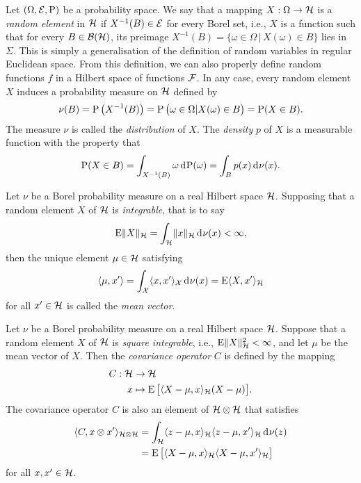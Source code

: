 Let $(\Omega,{\mathcal E},\operatorname{P})$ be a probability space.
We say that a mapping $X:\Omega\to{\mathcal H}$ is a \emph{random element} in ${\mathcal H}$ if $X^{-1}(B)\in{\mathcal E}$ for every Borel set, i.e., $X$ is a function such that for every $B\in{\mathcal B}({\mathcal H})$, its preimage $X^{-1}(B) = \{\omega \in \Omega \,|\, X(\omega) \in B \}$ lies in $\Sigma$.
This is simply a generalisation of the definition of random variables in regular Euclidean space.
From this definition, we can also properly define random functions $f$ in a Hilbert space of functions ${\mathcal F}$.
In any case, every random element $X$ induces a probability measure on ${\mathcal H}$ defined by
\[
  \nu(B) = \operatorname{P}\big(X^{-1}(B)\big) = \operatorname{P}\big( \omega \in \Omega | X(\omega) \in B  \big) = \operatorname{P}(X \in B).
\]
The measure $\nu$ is called the \emph{distribution} of $X$.
The \emph{density} $p$ of $X$ is a measurable function with the property that
\[
  \operatorname{P}(X \in B) = \int_{X^{-1}(B)} \omega \operatorname{d}\hspace{0.5pt}\!\operatorname{P}(\omega) = \int_B p(x) \operatorname{d}\hspace{0.5pt}\!\nu(x).
\]

\begin{definition}
  Let $\nu$ be a Borel probability measure on a real Hilbert space ${\mathcal H}$.
  Supposing that a random element $X$ of ${\mathcal H}$ is \emph{integrable}, that is to say
  \[
    \operatorname{E} \lVert X\rVert_{\mathcal H} = \int_{\mathcal H} \lVert x\rVert_{\mathcal H} \operatorname{d}\hspace{0.5pt}\!\nu(x) < \infty,
  \]
  then the unique element $\mu\in{\mathcal H}$ satisfying 
  \[
    \langle\mu,x'\rangle = \int_{\mathcal X} \langle x,x'\rangle_{\mathcal X} \operatorname{d}\hspace{0.5pt}\!\nu(x) = \operatorname{E}\langle X,x'\rangle_{\mathcal H}
  \]
  for all $x' \in {\mathcal H}$ is called the \emph{mean vector}. 
\end{definition}

\begin{definition}
  Let $\nu$ be a Borel probability measure on a real Hilbert space ${\mathcal H}$.
  Suppose that a random element $X$ of ${\mathcal H}$ is \emph{square integrable}, i.e., $\operatorname{E} \lVert X\rVert_{\mathcal H}^2 < \infty$, and let $\mu$ be the mean vector of $X$.
  Then the \emph{covariance operator} $C$ is defined by the mapping
  \begin{align*}
    C:{\mathcal H} &\to {\mathcal H} \\
    x &\mapsto \operatorname{E}\big[\langle X - \mu, x\rangle_{{\mathcal H}}(X - \mu) \big].
  \end{align*}
  The covariance operator $C$ is also an element of ${\mathcal H}\otimes{\mathcal H}$ that satisfies
  \begin{align*}
    \langle C,x\otimes x'\rangle_{{\mathcal H}\otimes{\mathcal H}} 
    &= \int_{\mathcal H} \langle z-\mu, x\rangle_{\mathcal H}\langle z-\mu,x'\rangle_{\mathcal H} \operatorname{d}\hspace{0.5pt}\!\nu(z) \\
    &= \operatorname{E}\big[\langle X-\mu,x\rangle_{\mathcal H} \langle X-\mu,x'\rangle_{\mathcal H}\big]
  \end{align*}
  for all $x,x'\in{\mathcal H}$.
\end{definition}

